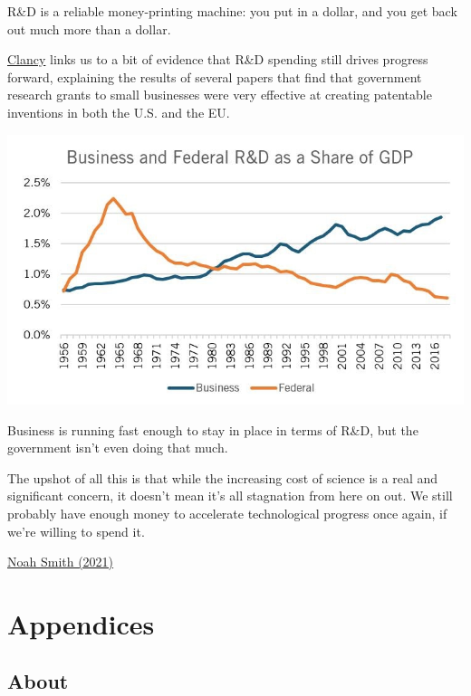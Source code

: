 \documentclass[
]{book}
\begin{document}
R\&D is a reliable money-printing machine: you put in a dollar, and you get back out much more than a dollar.

\href{https://mattsclancy.substack.com/p/an-example-of-high-returns-to-publicly}{Clancy} links us to a bit of evidence that R\&D spending still drives progress forward, explaining the results of several papers that find that government research grants to small businesses were very effective at creating patentable inventions in both the U.S. and the EU.

\includegraphics{fig/federal_and_business_RD.jpeg}

Business is running fast enough to stay in place in terms of R\&D, but the government isn't even doing that much.

The upshot of all this is that while the increasing cost of science is a real and significant concern, it doesn't mean it's all stagnation from here on out. We still probably have enough money to accelerate technological progress once again, if we're willing to spend it.

\href{https://noahpinion.substack.com/p/answering-the-techno-pessimists-complete}{Noah Smith (2021)}

\hypertarget{part-appendices}{%
\part{Appendices}\label{part-appendices}}

\hypertarget{appendix-appendices}{%
\appendix}


\hypertarget{about}{%
\chapter{About}\label{about}}
\end{document}
